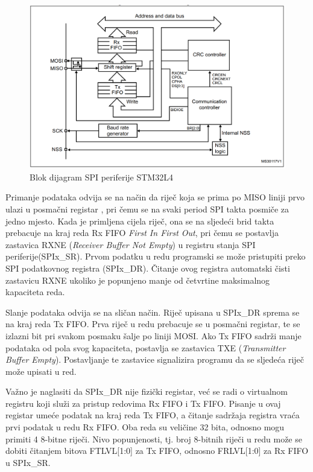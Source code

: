 		\begin{figure}[htb]
			\centering
			\includegraphics{slike/STM32L4_SPI_blok_dijagram.png}
			\caption{Blok dijagram SPI periferije STM32L4 \cite[str.~1451]{stm32l4_manual}}
			\label{fig:stm32l4_spi}
		\end{figure}
	
		Primanje podataka odvija se na način da riječ koja se prima po MISO liniji prvo ulazi u posmačni registar , pri čemu se na svaki period SPI takta posmiče za jedno mjesto. Kada je primljena cijela riječ, ona se na sljedeći brid takta prebacuje na kraj reda Rx FIFO \textit{First In First Out}, pri čemu se postavlja zastavica RXNE (\textit{Receiver Buffer Not Empty}) u registru stanja SPI periferije(SPIx\_SR). Prvom podatku u redu programski se može pristupiti preko SPI podatkovnog registra (SPIx\_DR). Čitanje ovog registra automatski čisti zastavicu RXNE ukoliko je popunjeno manje od četvrtine maksimalnog kapaciteta reda.
		
		Slanje podataka odvija se na sličan način. Riječ upisana u SPIx\_DR sprema se na kraj reda Tx FIFO. Prva riječ u redu prebacuje se u posmačni registar, te se izlazni bit pri svakom posmaku šalje po liniji MOSI. Ako Tx FIFO sadrži manje podataka od pola svog kapaciteta, postavlja se zastavica TXE (\textit{Transmitter Buffer Empty}). Postavljanje te zastavice signalizira programu da se sljedeća riječ može upisati u red.
		
		Važno je naglasiti da SPIx\_DR nije fizički registar, već se radi o virtualnom registru koji služi za pristup redovima Rx FIFO i Tx FIFO. Pisanje u ovaj registar umeće podatak na kraj reda Tx FIFO, a čitanje sadržaja registra vraća prvi podatak u redu Rx FIFO. Oba reda su veličine 32 bita, odnosno mogu primiti 4 8-bitne riječi. Nivo popunjenosti, tj. broj 8-bitnih riječi u redu može se dobiti čitanjem bitova FTLVL[1:0] za Tx FIFO, odnosno FRLVL[1:0] za Rx FIFO u SPIx\_SR. 
		
